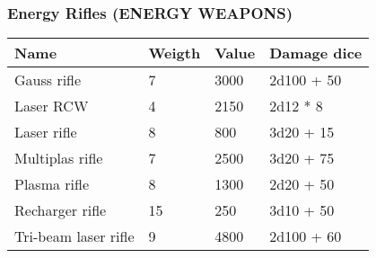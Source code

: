 
\subsubsection{Energy Rifles (ENERGY WEAPONS)}
\begin{longtable}{|p{4cm}|p{1.5cm}|p{1.5cm}|p{9cm}|}
\hline
\bfseries Name & \bfseries Weigth & \bfseries Value & \bfseries Damage dice \\
\hline
\endhead
Gauss rifle & 7 & 3000 & 2d100 + 50 \\
Laser RCW & 4 & 2150 & 2d12 * 8 \\
Laser rifle & 8 & 800 & 3d20 + 15 \\
Multiplas rifle & 7 & 2500 & 3d20 + 75 \\
Plasma rifle & 8 & 1300 & 2d20 + 50 \\
Recharger rifle & 15 & 250 & 3d10 + 50 \\
Tri-beam laser rifle & 9 & 4800 & 2d100 + 60 \\
\hline
\end{longtable}
